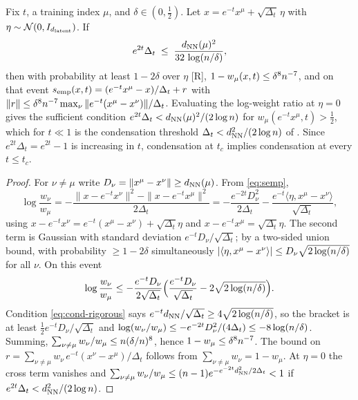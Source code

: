 \begin{lemma}\label{lem:condensation}
Fix $t$, a training index $\mu$, and $\delta\in(0,\tfrac12)$. Let $x=e^{-t}x^\mu+\sqrt{\Delta_t}\,\eta$ with $\eta\sim\mathcal N(0,I_{d_{\mathrm{latent}}})$. If
\begin{equation}\label{eq:cond-rigorous}
 e^{2t}\Delta_t\;\le\;\frac{d_{\rm NN}(\mu)^2}{32\,\log(n/\delta)},
\end{equation}
then with probability at least $1-2\delta$ over $\eta$ [R], $1-w_\mu(x,t)\le \delta^{8}n^{-7}$, and on that event $s_{\rm emp}(x,t)=(e^{-t}x^\mu-x)/\Delta_t+r$ with $\|r\|\le \delta^{8}n^{-7}\max_\nu\|e^{-t}(x^\mu-x^\nu)\|/\Delta_t$. Evaluating the log-weight ratio at $\eta=0$ gives the sufficient condition $e^{2t}\Delta_t<d_{\rm NN}(\mu)^2/(2\log n)$ for $w_\mu(e^{-t}x^\mu,t)>\tfrac12$, which for $t\ll1$ is the condensation threshold $\Delta_t<d_{\rm NN}^2/(2\log n)$ of \citet{biroli2024dynamical}. Since $e^{2t}\Delta_t=e^{2t}-1$ is increasing in $t$, condensation at $t_c$ implies condensation at every $t\le t_c$.
\end{lemma}
\begin{proof}
For $\nu\neq\mu$ write $D_\nu=\|x^\mu-x^\nu\|\ge d_{\rm NN}(\mu)$. From \eqref{eq:semp},
\[\log\frac{w_\nu}{w_\mu}=-\frac{\|x-e^{-t}x^\nu\|^2-\|x-e^{-t}x^\mu\|^2}{2\Delta_t}=-\frac{e^{-2t}D_\nu^2}{2\Delta_t}-\frac{e^{-t}\langle\eta,x^\mu-x^\nu\rangle}{\sqrt{\Delta_t}},\]
using $x-e^{-t}x^\nu=e^{-t}(x^\mu-x^\nu)+\sqrt{\Delta_t}\eta$ and $x-e^{-t}x^\mu=\sqrt{\Delta_t}\eta$. The second term is Gaussian with standard deviation $e^{-t}D_\nu/\sqrt{\Delta_t}$; by a two-sided union bound, with probability $\ge1-2\delta$ simultaneously $|\langle\eta,x^\mu-x^\nu\rangle|\le D_\nu\sqrt{2\log(n/\delta)}$ for all $\nu$. On this event
\[\log\frac{w_\nu}{w_\mu}\le-\frac{e^{-t}D_\nu}{2\sqrt{\Delta_t}}\Big(\frac{e^{-t}D_\nu}{\sqrt{\Delta_t}}-2\sqrt{2\log(n/\delta)}\Big).\]
Condition \eqref{eq:cond-rigorous} says $e^{-t}d_{\rm NN}/\sqrt{\Delta_t}\ge4\sqrt{2\log(n/\delta)}$, so the bracket is at least $\tfrac12e^{-t}D_\nu/\sqrt{\Delta_t}$ and $\log(w_\nu/w_\mu)\le-e^{-2t}D_\nu^2/(4\Delta_t)\le-8\log(n/\delta)$. Summing, $\sum_{\nu\ne\mu}w_\nu/w_\mu\le n(\delta/n)^8$, hence $1-w_\mu\le\delta^8n^{-7}$. The bound on $r=\sum_{\nu\neq\mu}w_\nu\,e^{-t}(x^\nu-x^\mu)/\Delta_t$ follows from $\sum_{\nu\ne\mu}w_\nu=1-w_\mu$. At $\eta=0$ the cross term vanishes and $\sum_{\nu\neq\mu}w_\nu/w_\mu\le(n-1)e^{-e^{-2t}d_{\rm NN}^2/2\Delta_t}<1$ if $e^{2t}\Delta_t<d_{\rm NN}^2/(2\log n)$.
\end{proof}

